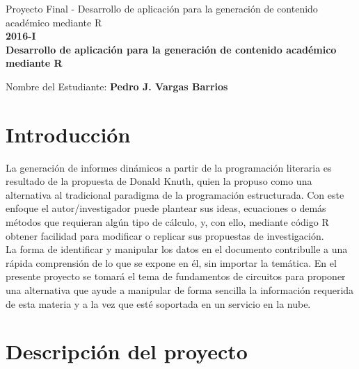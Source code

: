 \documentclass[10pt]{article}\usepackage[]{graphicx}\usepackage[]{color}
\begin{document}
	\renewcommand{\headrulewidth}{0.5pt}

	\thispagestyle{empty}						%
	\begin{center}
		\large {Proyecto Final - Desarrollo de aplicación para la generación de contenido académico mediante R\\
			\hspace{0 cm}\textbf{2016-I}}
		\bigskip  
		\textbf{
			\LARGE{\\Desarrollo de aplicación para la generación de contenido académico mediante R}}\\								%
	\end{center}	
	\begin{flushright}	
		\bigskip	
		Nombre del Estudiante: \textbf{Pedro J. Vargas Barrios}			%
	\end{flushright} 
	
	
	
	\section{Introducción}

La generación de informes dinámicos a partir de la programación literaria es resultado de la propuesta de Donald Knuth, quien la propuso como una alternativa al tradicional paradigma de la programación estructurada. Con este enfoque el autor/investigador puede plantear sus ideas, ecuaciones o demás métodos que requieran algún tipo de cálculo, y, con ello, mediante código R obtener facilidad para modificar o replicar sus propuestas de investigación.\\
La forma de identificar y manipular los datos en el documento contribulle a una rápida comprensión de lo que se expone en él, sin importar la temática. En el presente proyecto se tomará el tema de fundamentos de circuitos para proponer una alternativa que ayude a manipular de forma sencilla la información requerida de esta materia y a la vez que esté soportada en un servicio en la nube.
 
\section{Descripción del proyecto}
\end{document}

